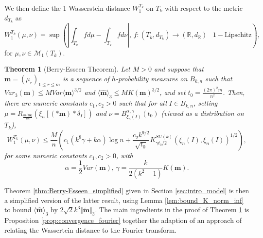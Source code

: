 \documentclass[10pt,11pt]{amsart}%
\newtheorem{theorem}{Theorem}[section]
\begin{document}
We then define the 1-Wasserstein distance $W_{1}^{T_{k}}$ on $ T_{k}$ with respect to the metric $d_{ T_{k}}$ as  
$$W_{1}^{T_{k}}(\mu,\nu)=\sup\left(\left\vert \int_{ T_{k}}f d\mu -\int_{ T_{k}}f d\nu\right\vert, \, f: ( T_{k},d_{ T_{k}})\rightarrow(\mathbb{R},d_{\mathbb{R}}) \,\text{ $1-$Lipschitz}\right),$$
for $\mu,\nu\in  \mathcal{M}_1(T_{k})$.
\begin{theorem}[Berry-Esseen Theorem]\label{thm:Berry-Esseen}
Let $M>0$ and suppose that $\mathbf{m}=(\mu_r)_{1\leq r\leq m}$ is a sequence of $h$-probability measures on $ B_{k,n}$ such that $Var_{3}(\mathbf{m})\leq M Var\langle\mathbf{m}\rangle^{3/2}$ and $\langle\hat{\mathbf{m}}\rangle_3\leq MK(\mathbf{m})^{3/2}$, and set $t_0=\frac{(2\pi)^2m}{n^2}$. Then, there are numeric constants $c_1,c_2>0$ such that for all $I\in  B_{k,n}$, setting $\mu=R_{\frac{m\langle\mathbf{m}\rangle}{kn}}\left(\xi_{n}\left[(\ast \mathbf{m})*\delta_I\right]\right)$ and $\nu=B^{\alpha,\gamma}_{\xi_n(I)}\left(t_0\right)$ (viewed as a distribution on $T_k$),
$$W_1^{T_k}\left(\mu, \nu\right)\leq \frac{M}{n}\left(c_1(k^8\gamma+k\alpha)\log n+\frac{c_2k^{9/2}}{\sqrt{t_0}}K_{\gamma t_0/2}^{SU(k)}\left(\xi_n(I),\xi_n(I)\right)^{1/2}\right),$$
for some numeric constants $c_1,c_2>0$, with
$$\alpha=\frac{1}{2}Var(\mathbf{m}), \, \gamma=\frac{k}{2(k^2-1)}K(\mathbf{m}).$$ 
\end{theorem}
Theorem \ref{thm:Berry-Esseen_simplified} given in Section \ref{sec:intro_model} is then a simplified version of the latter result, using Lemma \ref{lem:bound_K_norm_inf} to bound $\langle \hat{\mathbf{m}}\rangle_3$ by $2\sqrt{2}k^3\Vert \tilde{\mathbf{m}}\Vert_3$. The main ingredients in the proof of Theorem \ref{thm:Berry-Esseen} is Proposition \ref{prop:convergence_fourier} together the adaption of an approach of \cite{BobLed} relating the Wassertein distance to the Fourier transform. 
\end{document}
